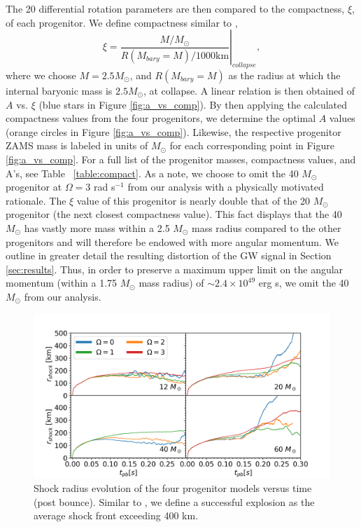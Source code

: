 \documentclass[twocolumn,times]{aastex62}  %
\begin{document}
\par The 20 differential rotation parameters are then compared to the compactness, $\xi$, of each progenitor.  We define compactness similar to \citet{oconnor:2011}, 
\begin{equation}
    \xi = \left.\frac{M/M_{\odot}}{R(M_{bary}=M)/1000 \text{km}}\right\vert_{collapse} ,
\end{equation} 
where we choose $M = 2.5 M_\odot$, and $R(M_{bary}=M) $ as the radius at which the internal baryonic mass is $2.5M_\odot$, at collapse.  A linear relation is then obtained of $A$ vs. $\xi$ (blue stars in Figure \ref{fig:a_vs_comp}).  By then applying the calculated compactness values from the four \citet{Suk:2016} progenitors, we determine the  optimal $A$ values (orange circles in Figure \ref{fig:a_vs_comp}).  Likewise, the respective progenitor ZAMS mass is labeled in units of $M_\odot$ for each corresponding point in Figure \ref{fig:a_vs_comp}.  For a full list of the progenitor masses, compactness values, and A's, see Table ~\ref{table:compact}.  As a note, we choose to omit the 40 $M_\odot$ progenitor at $\Omega = 3$ rad s$^{-1}$ from our analysis with a physically motivated rationale.  The $\xi$ value of this progenitor is nearly double that of the 20 $M_\odot$ progenitor (the next closest compactness value).  This fact displays that the 40 $M_\odot$ has vastly more mass within a 2.5 $M_\odot$ mass radius compared to the other progenitors and will therefore be endowed with more angular momentum.  We outline in greater detail the resulting distortion of the GW signal in Section \ref{sec:results}.  Thus, in order to preserve a maximum upper limit on the angular momentum (within a 1.75 $M_\odot$ mass radius) of $\sim 2.4\times 10^{49}$ erg s, we omit the 40 $M_\odot$ from our analysis.  \\



%
\begin{figure}[t]
    \centering
    \includegraphics[scale=0.40]{figures/M1_shock_mass.png}
    \caption{Shock radius evolution of the four  progenitor models versus time (post bounce).  Similar to \citet{couch:2013b}, we define a successful explosion as the average shock front exceeding 400 km. }
    \label{fig:shock}
\end{figure}
\end{document}
